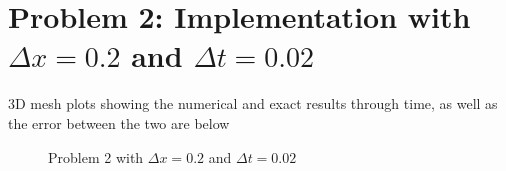 \documentclass[12pt,letterpaper]{article}
\begin{document}
\section*{Problem 2: Implementation with $\Delta x = 0.2$ and $\Delta t = 0.02$}

3D mesh plots showing the numerical and exact results through time, as well as the error between the two are below\:

\begin{figure}[!h]
    \centering

    
    \caption{Problem 2 with $\Delta x = 0.2$ and $\Delta t = 0.02$}
\end{figure}
\end{document}
